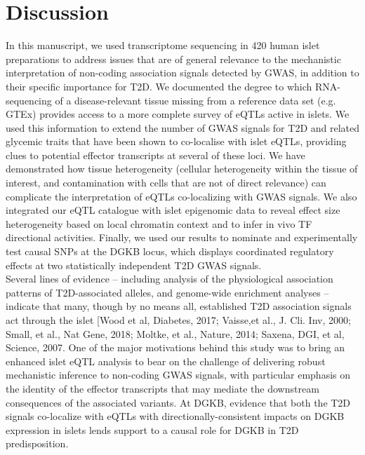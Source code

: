 \section{Discussion}
In this manuscript, we used transcriptome sequencing in 420 human islet preparations to address issues that are of general relevance to the mechanistic interpretation of non-coding association signals detected by GWAS, in addition to their specific importance for T2D. We documented the degree to which RNA-sequencing of a disease-relevant tissue missing from a reference data set (e.g. GTEx) provides access to a more complete survey of eQTLs active in islets. We used this information to extend the number of GWAS signals for T2D and related glycemic traits that have been shown to co-localise with islet eQTLs, providing clues to potential effector transcripts at several of these loci.  We have demonstrated how tissue heterogeneity (cellular heterogeneity within the tissue of interest, and contamination with cells that are not of direct relevance) can complicate the interpretation of eQTLs co-localizing with GWAS signals. We also integrated our eQTL catalogue with islet epigenomic data to reveal effect size heterogeneity based on local chromatin context and to infer in vivo TF directional activities. Finally, we used our results to nominate and experimentally test causal SNPs at the DGKB locus, which displays coordinated regulatory effects at two statistically independent T2D GWAS signals. \\
Several lines of evidence – including analysis of the physiological association patterns of T2D-associated alleles, and genome-wide enrichment analyses – indicate that many, though by no means all, established T2D association signals act through the islet [Wood et al, Diabetes, 2017; Vaisse,et al., J. Cli. Inv, 2000; Small, et al., Nat Gene, 2018; Moltke, et al.,  Nature, 2014; Saxena, DGI, et al, Science, 2007. One of the major motivations behind this study was to bring an enhanced islet eQTL analysis to bear on the challenge of delivering robust mechanistic inference to non-coding GWAS signals, with particular emphasis on the identity of the effector transcripts that may mediate the downstream consequences of the associated variants. At DGKB, evidence that both the T2D signals co-localize with eQTLs with directionally-consistent impacts on DGKB expression in islets lends support to a causal role for DGKB in T2D predisposition.

